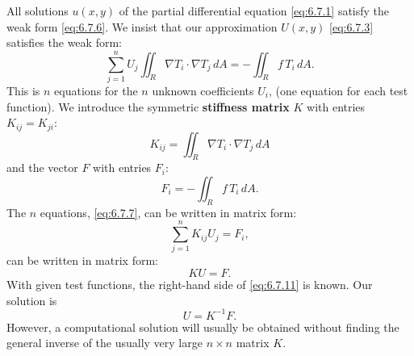 All solutions $u(x,y)$ of the partial differential equation \eqref{eq:6.7.1} satisfy the weak form \eqref{eq:6.7.6}.  We insist that our approximation $U(x,y)$ \eqref{eq:6.7.3} satisfies the weak form:
\begin{equation}
\sum_{j=1}^{n} U_j \iint_R \nabla T_i \cdot \nabla T_j\,dA = -\iint_R f\,T_i\,dA.
\label{eq:6.7.7}
\end{equation}
This is $n$ equations for the $n$ unknown coefficients $U_i$, (one equation for each test function).  We introduce the symmetric \textbf{stiffness matrix} $K$ with entries $K_{ij} = K_{ji}$:
\begin{equation}
K_{ij} = \iint_R \nabla T_i \cdot \nabla T_j\,dA
\label{eq:6.7.8}
\end{equation}
and the vector $F$ with entries $F_i$:
\begin{equation}
F_i = -\iint_R f\,T_i\,dA.
\label{eq:6.7.9}
\end{equation}
The $n$ equations, \eqref{eq:6.7.7}, can be written in matrix form:
\begin{equation}
\sum_{j=1}^{n} K_{ij} U_j = F_i,
\label{eq:6.7.10}
\end{equation}
can be written in matrix form:
\begin{equation}
KU = F.
\label{eq:6.7.11}
\end{equation}
With given test functions, the right-hand side of \eqref{eq:6.7.11} is known.  Our solution is
\begin{equation}
U = K^{-1}F.
\label{eq:6.7.12}
\end{equation}
However, a computational solution will usually be obtained without finding the general inverse of the usually very large $n \times n$ matrix $K$.

